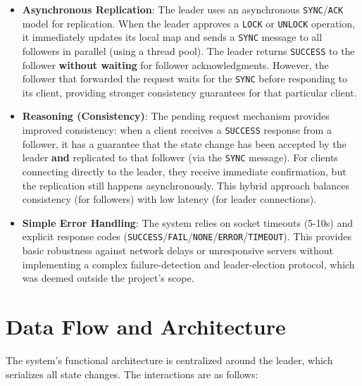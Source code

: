\documentclass[a4paper,11pt]{article}
\begin{document}
\begin{itemize}
    \item \textbf{Asynchronous Replication}: The leader uses an asynchronous \texttt{SYNC}/\texttt{ACK} model for replication. When the leader approves a \texttt{LOCK} or \texttt{UNLOCK} operation, it immediately updates its local map and sends a \texttt{SYNC} message to all followers in parallel (using a thread pool). The leader returns \texttt{SUCCESS} to the follower \textbf{without waiting} for follower acknowledgments. However, the follower that forwarded the request waits for the \texttt{SYNC} before responding to its client, providing stronger consistency guarantees for that particular client.
    
    \item \textbf{Reasoning (Consistency)}: The pending request mechanism provides improved consistency: when a client receives a \texttt{SUCCESS} response from a follower, it has a guarantee that the state change has been accepted by the leader \textbf{and} replicated to that follower (via the \texttt{SYNC} message). For clients connecting directly to the leader, they receive immediate confirmation, but the replication still happens asynchronously. This hybrid approach balances consistency (for followers) with low latency (for leader connections).

    \item \textbf{Simple Error Handling}: The system relies on socket timeouts (5-10s) and explicit response codes (\texttt{SUCCESS}/\texttt{FAIL}/\texttt{NONE}/\texttt{ERROR}/\texttt{TIMEOUT}). This provides basic robustness against network delays or unresponsive servers without implementing a complex failure-detection and leader-election protocol, which was deemed outside the project's scope.
\end{itemize}

\section{Data Flow and Architecture}
The system's functional architecture is centralized around the leader, which serializes all state changes. The interactions are as follows:
\end{document}
